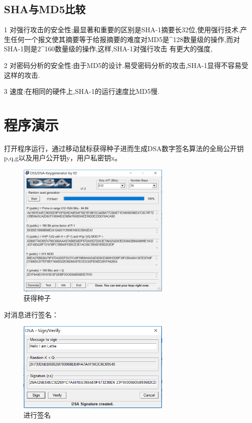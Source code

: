 \documentclass[UTF8,a4paper]{article}
\begin{document}
	\subsection{SHA与MD5比较}


1 对强行攻击的安全性;最显著和重要的区别是SHA-1摘要长32位,使用强行技术.产生任何一个报文使其摘要等于给报摘要的难度对MD5是\^{}128数量级的操作,而对SHA-1则是2\^{}160数量级的操作,这样,SHA-1对强行攻击 有更大的强度, 


2 对密码分析的安全性:由于MD5的设计.易受密码分析的攻击,SHA-1显得不容易受这样的攻击. 


3 速度:在相同的硬件上,SHA-1的运行速度比MD5慢.









\section{程序演示}

打开程序运行，通过移动鼠标获得种子进而生成DSA数字签名算法的全局公开钥p,q,g以及用户公开钥y，用户私密钥x。\par \newpage
\begin{figure}[!ht]
	
	\centering
	\includegraphics[width=0.67\textwidth]{pic1.PNG}
	\caption{获得种子}
	\label{fig:1-1}
\end{figure}
对消息进行签名：\par 
\begin{figure}[!ht]
	
	\centering
	\includegraphics[width=0.67\textwidth]{pic2.PNG}
	\caption{进行签名}
	\label{fig:1-1}
\end{figure}
\end{document}
